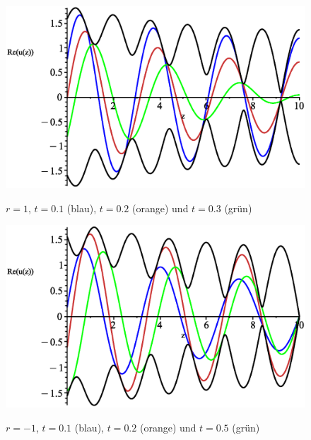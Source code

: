\documentclass[paper=a4, parskip=half-, ngerman, fontsize=11pt]{scrreprt}
\begin{document}
\begin{figure}[H]
    \vspace{1ex}

    \begin{minipage}{0.45\textwidth}
        \centering
        \includegraphics[width=\linewidth]{../graphics/Enveloppe/verlustbehaftet/R1}
        \caption*{$r=1$, $t=0.1$ (blau), $t=0.2$ (orange) und $t=0.3$ (grün)}
    \end{minipage}\hfill
    \begin{minipage}{0.45\textwidth}
        \centering
        \includegraphics[width=\linewidth]{../graphics/Enveloppe/verlustbehaftet/R-1}
        \caption*{$r=-1$, $t=0.1$ (blau), $t=0.2$ (orange) und $t=0.5$ (grün)}
    \end{minipage}

    \captionsetup{labelformat=empty, skip=0pt}
    \caption{}
    \label{WellenausbreitungVerlustbehaftet}

\end{figure}


\printbibliography
\end{document}
